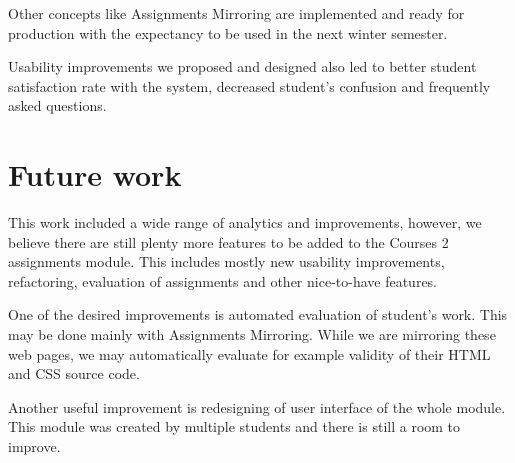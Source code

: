 Other concepts like Assignments Mirroring are implemented and ready for production with the expectancy to be used in the next winter semester.

Usability improvements we proposed and designed also led to better student satisfaction rate with the system, decreased student's confusion and frequently asked questions.

\section*{Future work}
This  work included a wide range of analytics and improvements, however, we believe there are still plenty more features to be added to the Courses 2 assignments module. This includes mostly new usability improvements, refactoring, evaluation of assignments and other nice-to-have features.

One of the desired improvements is automated evaluation of student's work. This may be done mainly with Assignments Mirroring. While we are mirroring these web pages, we may automatically evaluate for example validity of their HTML and CSS source code.

Another useful improvement is redesigning of user interface of the whole module. This module was created by multiple students and there is still a room to improve.
